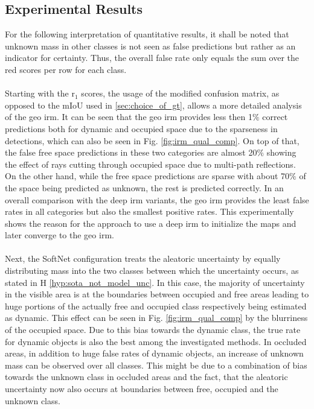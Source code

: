 \subsection{Experimental Results}
\label{subsec:exp_results_aleat_uncert}
For the following interpretation of quantitative results, it shall be noted that unknown mass in other classes is not seen as false predictions but rather as an indicator for certainty. Thus, the overall false rate only equals the sum over the red scores per row for each class. 
\\\\
Starting with the \gls{r}$_1$ scores, the usage of the modified confusion matrix, as opposed to the mIoU used in \ref{sec:choice_of_gt}, allows a more detailed analysis of the geo \gls{irm}. It can be seen that the geo \gls{irm} provides less then 1$\%$ correct predictions both for dynamic and occupied space due to the sparseness in detections, which can also be seen in Fig. \ref{fig:irm_qual_comp}. On top of that, the false free space predictions in these two categories are almost 20$\%$ showing the effect of rays cutting through occupied space due to multi-path reflections. On the other hand, while the free space predictions are sparse with about 70$\%$ of the space being predicted as unknown, the rest is predicted correctly. In an overall comparison with the deep \gls{irm} variants, the geo \gls{irm} provides the least false rates in all categories but also the smallest positive rates. This experimentally shows the reason for the approach to use a deep \gls{irm} to initialize the maps and later converge to the geo \gls{irm}.
\\\\
Next, the SoftNet configuration treats the aleatoric uncertainty by equally distributing mass into the two classes between which the uncertainty occurs, as stated in H \ref{hyp:sota_not_model_unc}. In this case, the majority of uncertainty in the visible area is at the boundaries between occupied and free areas leading to huge portions of the actually free and occupied class respectively being estimated as dynamic. This effect can be seen in Fig. \ref{fig:irm_qual_comp} by the blurriness of the occupied space. Due to this bias towards the dynamic class, the true rate for dynamic objects is also the best among the investigated methods. In occluded areas, in addition to huge false rates of dynamic objects, an increase of unknown mass can be observed over all classes. This might be due to a combination of bias towards the unknown class in occluded areas and the fact, that the aleatoric uncertainty now also occurs at boundaries between free, occupied and the unknown class. 

